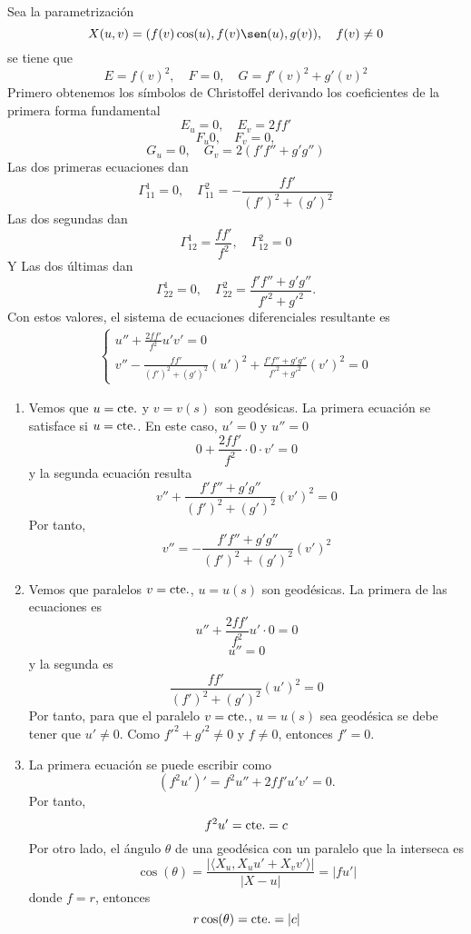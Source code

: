 \begin{ejm}
  Sea la parametrización 
  \[ 
    X(u,v) = (f(v) \cos(u), f(v) \sen(u), g(v)), \quad f(v) \neq 0
  \] 
  se tiene que
  \[ 
    E = f(v)^{2}, \quad F = 0, \quad G = f'(v)^{2} + g'(v)^{2}
  \] 
  Primero obtenemos los símbolos de Christoffel derivando los coeficientes de la primera forma fundamental
  \[ 
    E_{u} = 0, \quad E_{v} = 2 f f' 
  \] 
  \[ 
    F_{u} 0, \quad F_{v} = 0, 
  \] 
  \[ 
    G_{u} = 0, \quad G_{v} = 2(f' f'' + g' g'') 
  \] 
  Las dos primeras ecuaciones dan
  \[ 
    \Gamma_{11}^{1} = 0, \quad \Gamma_{11}^{2} = - \frac{f f'}{(f')^{2} + (g')^{2}} 
  \] 
  Las dos segundas dan
  \[ 
    \Gamma_{12}^{1} = \frac{f f'}{f^{2}}, \quad \Gamma_{12}^{2} = 0
  \] 
  Y Las dos últimas dan
  \[ 
    \Gamma_{22}^{1} = 0, \quad \Gamma_{22}^{2} = \frac{f' f'' + g' g''}{f'^{2} + g'^{2}}.
  \] 
  Con estos valores, el sistema de ecuaciones diferenciales resultante es
  \[ 
    \begin{aligned}
      \begin{cases}
        u'' + \frac{2 f f'}{f^{2}}u' v' = 0 \\
        v'' - \frac{f f'}{(f')^{2} + (g')^{2}}(u')^{2} + \frac{f' f'' + g' g''}{f'^{2} + g'^{2}}(v')^{2} = 0
      \end{cases}
    \end{aligned} 
  \]   
  \begin{enumerate}[label=(\roman*)]
    \item   Vemos que $u = \operatorname{cte.}$ y $v = v(s)$ son geodésicas. La primera ecuación se satisface si $u = \operatorname{cte.}$. En este caso, $u' = 0$ y $u'' = 0$
  \[ 
    0 + \frac{2 f f'}{f^{2}} \cdot 0 \cdot v' = 0 
  \] 
  y la segunda ecuación resulta
  \[ 
    v'' + \frac{f' f'' + g' g''}{(f')^{2} + (g')^{2}} (v')^{2} = 0 
  \] 
  Por tanto,
  \[ 
    v'' = - \frac{f' f'' + g' g''}{(f')^{2} + (g')^{2}} (v')^{2}
  \] 
    \item Vemos que paralelos $v = \operatorname{cte.}$, $u = u(s)$ son geodésicas. La primera de las ecuaciones es
      \[ 
        u'' + \frac{2 f f'}{f^{2}}u' \cdot 0 = 0
      \] 
      \[ 
        u'' = 0 
      \] 
      y la segunda es
      \[ 
        \frac{f f'}{(f')^{2} + (g')^{2}}(u')^{2} = 0
      \] 
      Por tanto, para que el paralelo $v = \operatorname{cte.}$, $u = u(s)$ sea geodésica se debe tener que $u' \neq 0$. Como $f'^{2} + g'^{2} \neq 0$ y $ f \neq 0$, entonces $f' = 0$.
    \item La primera ecuación se puede escribir como 
      \[ 
        (f^{2} u')' = f^{2} u'' + 2 f f' u' v' = 0.
      \] 
      Por tanto, 
      \[ 
        f^{2} u' = \operatorname{cte.} = c 
      \] 
      Por otro lado, el ángulo $\theta$ de una geodésica con un paralelo que la interseca es 
      \[ 
        \cos(\theta) = \frac{| \langle X_{u}{ , }X_{u} u' + X_{v} v' \rangle |}{| X-u |} = | f u' | 
      \] 
      donde $f = r$, entonces
      \[  
        r \cos(\theta) = \operatorname{cte.} = | c |
      \] 

  \end{enumerate}
\end{ejm}

